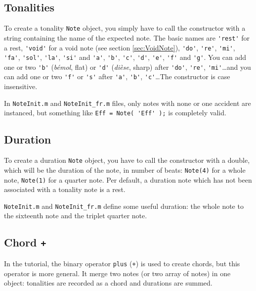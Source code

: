 \documentclass{article}
\newcommand{\note}{\lstinline!Note!\xspace}
\newcommand{\file}[1]{\texttt{#1}\xspace}
\newcommand{\noteInitFile}{\file{NoteInit.m}}
\newcommand{\noteInitFrFile}{\file{NoteInit\_fr.m}}
\begin{document}
\subsection{Tonalities}
\label{sec:Tonalities}

To create a tonality \note object, you simply have to call the constructor with a string containing the name of the expected note. The basic names are \lstinline!'rest'! for a rest, \lstinline!'void'! for a void note (see section \ref{sec:VoidNote}), \lstinline!'do'!, \lstinline!'re'!, \lstinline!'mi'!, \lstinline!'fa'!, \lstinline!'sol'!, \lstinline!'la'!, \lstinline!'si'! and \lstinline!'a'!, \lstinline!'b'!, \lstinline!'c'!, \lstinline!'d'!, \lstinline!'e'!, \lstinline!'f'! and \lstinline!'g'!. You can add one or two \lstinline!'b'! (\emph{b\'emol}, flat) or \lstinline!'d'! (\emph{di\`ese}, sharp) after \lstinline!'do'!, \lstinline!'re'!, \lstinline!'mi'!\dots and you can add one or two \lstinline!'f'! or \lstinline!'s'! after \lstinline!'a'!, \lstinline!'b'!, \lstinline!'c'!\dots The constructor is case insensitive.

In \noteInitFile and \noteInitFrFile files, only notes with none or one accident are instanced, but something like \lstinline!Eff = Note( 'Eff' );! is completely valid.

\subsection{Duration}
\label{sec:Duration}

To create a duration \note object, you have to call the constructor with a double, which will be the duration of the note, in number of beats: \lstinline!Note(4)! for a whole note, \lstinline!Note(1)! for a quarter note. Per default, a duration note which has not been associated with a tonality note is a rest.

\noteInitFile and \noteInitFrFile define some useful duration: the whole note to the sixteenth note and the triplet quarter note.

\subsection{Chord \lstinline!+!}
\label{sec:Chord}

In the tutorial, the binary operator \lstinline!plus! (\lstinline!+!) is used to create chords, but this operator is more general. It merge two notes (or two array of notes) in one object: tonalities are recorded as a chord and durations are summed.
\end{document}
